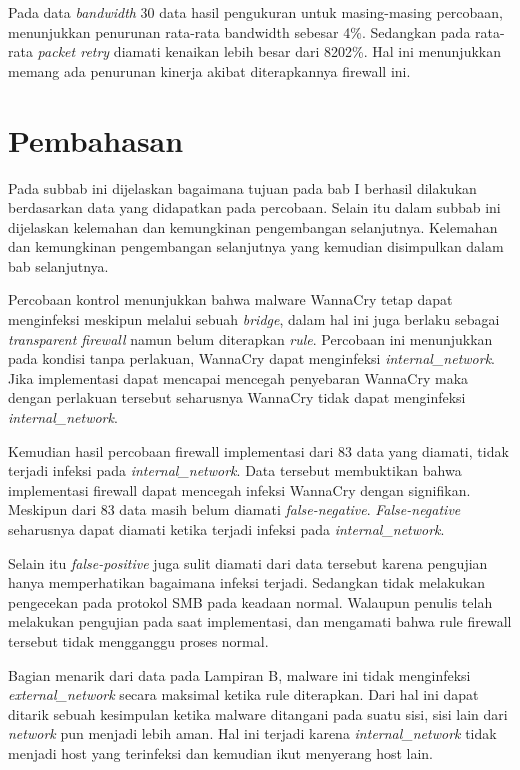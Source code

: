 Pada data \textit{bandwidth} 30 data hasil pengukuran untuk masing-masing percobaan, menunjukkan penurunan rata-rata bandwidth sebesar 4\%. Sedangkan pada rata-rata \textit{packet retry} diamati kenaikan lebih besar dari 8202\%. Hal ini menunjukkan memang ada penurunan kinerja akibat diterapkannya firewall ini.

\section{Pembahasan}

Pada subbab ini dijelaskan bagaimana tujuan pada bab I berhasil dilakukan berdasarkan data yang didapatkan pada percobaan. Selain itu dalam subbab ini dijelaskan kelemahan dan kemungkinan pengembangan selanjutnya. Kelemahan dan kemungkinan pengembangan selanjutnya yang kemudian disimpulkan dalam bab selanjutnya.

Percobaan kontrol menunjukkan bahwa malware WannaCry tetap dapat menginfeksi meskipun melalui sebuah \textit{bridge}, dalam hal ini juga berlaku sebagai \textit{transparent firewall} namun belum diterapkan \textit{rule}. Percobaan ini menunjukkan pada kondisi tanpa perlakuan, WannaCry dapat menginfeksi \textit{internal\_network}. Jika implementasi dapat mencapai mencegah penyebaran WannaCry maka dengan perlakuan tersebut seharusnya WannaCry tidak dapat menginfeksi \textit{internal\_network}.

Kemudian hasil percobaan firewall implementasi dari 83 data yang diamati, tidak terjadi infeksi pada \textit{internal\_network}. Data tersebut membuktikan bahwa implementasi firewall dapat mencegah infeksi WannaCry dengan signifikan. Meskipun dari 83 data masih belum diamati \textit{false-negative}. \textit{False-negative} seharusnya dapat diamati ketika terjadi infeksi pada \textit{internal\_network}.

Selain itu \textit{false-positive} juga sulit diamati dari data tersebut karena pengujian hanya memperhatikan bagaimana infeksi terjadi. Sedangkan tidak melakukan pengecekan pada protokol SMB pada keadaan normal. Walaupun penulis telah melakukan pengujian pada saat implementasi, dan mengamati bahwa rule firewall tersebut tidak mengganggu proses normal.

Bagian menarik dari data pada Lampiran B, malware ini tidak menginfeksi \textit{external\_network} secara maksimal ketika rule diterapkan. Dari hal ini dapat ditarik sebuah kesimpulan ketika malware ditangani pada suatu sisi, sisi lain dari \textit{network} pun menjadi lebih aman. Hal ini terjadi karena \textit{internal\_network} tidak menjadi host yang terinfeksi dan kemudian ikut menyerang host lain.

